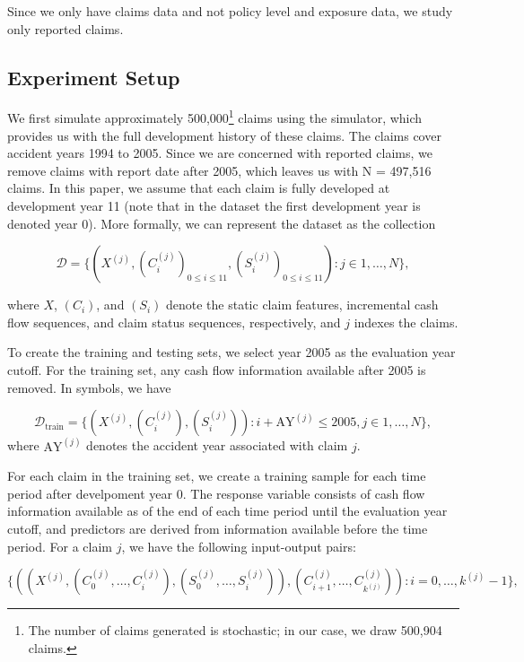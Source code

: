 \documentclass{article}
\begin{document}
Since we only have claims data and not policy level and exposure data, we study 
only reported claims.

\subsection{Experiment Setup}

We first simulate approximately 500,000\footnote{The number of claims generated
is stochastic; in our case, we draw 500,904 claims.} claims using the simulator,
which provides us with the full development history of these claims. The claims 
cover accident years 1994 to 2005. Since we are concerned with reported claims,
we remove claims with report date after 2005, which leaves us with N = 497,516 
claims. In this paper, we assume that each claim is fully developed at 
development year 11 (note that in the dataset the first development year is 
denoted year 0). More formally, we can represent the dataset as the collection

\begin{equation}
    \mathcal{D} = \{ (X^{(j)}, (C_i^{(j)})_{0 \leq i \leq 11}, (S_i^{(j)})_{0 \leq i \leq 11}): j\in {1,\dots, N}\},
\end{equation}

where $X$, $(C_i)$, and $(S_i)$ denote the static claim features, incremental 
cash flow sequences, and claim status sequences, respectively, and $j$ indexes 
the claims.

To create the training and testing sets, we select year 2005 as the evaluation 
year cutoff. For the training set, any cash flow information available after
2005 is removed. In symbols, we have

\begin{equation}
    \mathcal{D}_{\text{train}} = \{ (X^{(j)}, (C_i^{(j)}), (S_i^{(j)})): i + \text{AY}^{(j)} \leq 2005, j \in {1,\dots, N}\},
\end{equation}
where $\text{AY}^{(j)}$ denotes the accident year associated with claim $j$.

For each claim in the training set, we create a training sample for each time 
period after develpoment year 0. The response variable consists of cash flow 
information available as of the end of each time period until the evaluation 
year cutoff, and predictors are derived from information available before the
time period. For a claim $j$, we have the following input-output pairs:

\begin{equation}\label{eq:training-samples}
    \{((X^{(j)}, (C_0^{(j)}, \dots, C_i^{(j)}), (S_0^{(j)}, \dots, S_i^{(j)})), (C_{i+1}^{(j)}, \dots, C_{k^{(j)}}^{(j)})): i = 0, \dots, k^{(j)} - 1\},
\end{equation}
\end{document}
